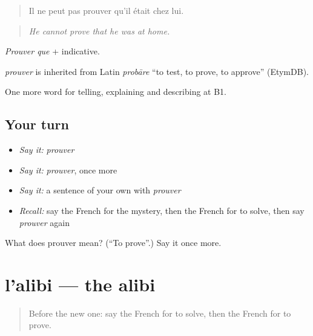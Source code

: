 \begin{quote}
Il ne peut pas prouver qu'il était chez lui.
\end{quote}

\begin{quote}
\emph{He cannot prove that he was at home.}
\end{quote}

\emph{Prouver que} + indicative.

\begin{cousinweb}
\emph{prouver} is inherited from Latin \emph{probāre} \textquotedblleft{}to test, to prove, to approve\textquotedblright{} (EtymDB).
\end{cousinweb}

\begin{grammarlens}[title={What you've built}]
One more word for telling, explaining and describing at B1.
\end{grammarlens}

\subsection*{Your turn}
\begin{itemize}
\raggedright
  \item \emph{Say it:} \emph{prouver}
  \item \emph{Say it:} \emph{prouver}, once more
  \item \emph{Say it:} a sentence of your own with \emph{prouver}
  \item \emph{Recall:} say the French for the mystery, then the French for to solve, then say \emph{prouver} again
\end{itemize}

\begin{tcolorbox}[breakable,colback=teal!4,colframe=teal!35!black,title={Before you move on}]
What does prouver mean? (\textquotedblleft{}To prove\textquotedblright{}.) Say it once more.
\end{tcolorbox}
\section[l'alibi]{l'alibi — the alibi}

\label{lesson:FR-C293-alibi}



\begin{quote}
Before the new one: say the French for to solve, then the French for to prove.
\end{quote}

